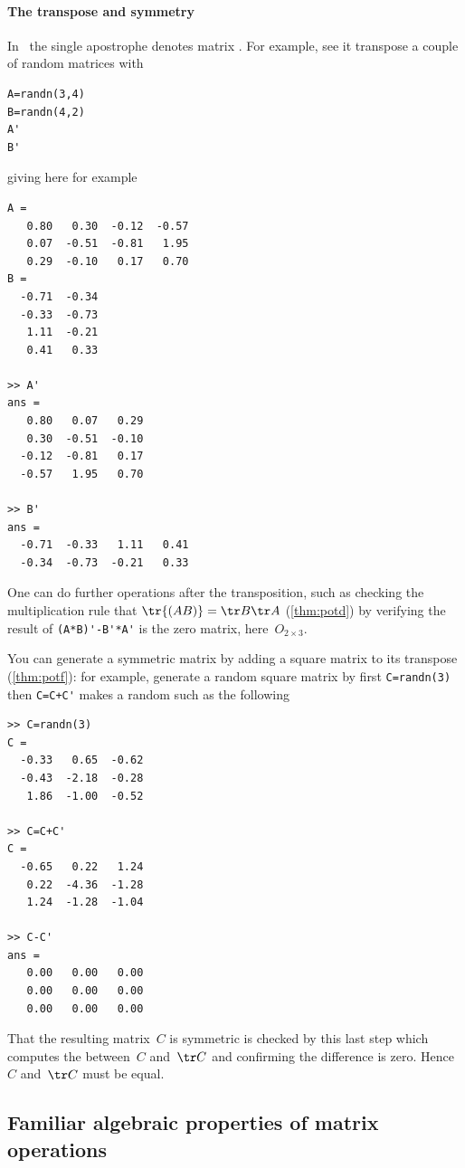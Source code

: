 \paragraph{The transpose and symmetry}
In \script\ the single apostrophe denotes matrix .
For example, see it transpose a couple of random matrices with
\begin{verbatim}
A=randn(3,4)
B=randn(4,2)
A'
B'
\end{verbatim}
\setbox\ajrqrbox\hbox{}%
\marginajrbox%
giving here for example \twodp
\begin{verbatim}
A =
   0.80   0.30  -0.12  -0.57
   0.07  -0.51  -0.81   1.95
   0.29  -0.10   0.17   0.70
B =
  -0.71  -0.34
  -0.33  -0.73
   1.11  -0.21
   0.41   0.33

>> A'
ans =
   0.80   0.07   0.29
   0.30  -0.51  -0.10
  -0.12  -0.81   0.17
  -0.57   1.95   0.70

>> B'
ans =
  -0.71  -0.33   1.11   0.41
  -0.34  -0.73  -0.21   0.33
\end{verbatim}
One can do further operations after the transposition, such as checking the multiplication rule that \(\tr{(AB)}=\tr B\tr A\) (\cref{thm:potd}) by verifying the result of \verb|(A*B)'-B'*A'| is the zero matrix, here~\(O_{2\times3}\).

You can generate a symmetric matrix by adding a square matrix to its transpose (\cref{thm:potf}): for example, generate a random square matrix by first \verb|C=randn(3)| then \verb|C=C+C'| makes a random  such as the following \twodp
\begin{verbatim}
>> C=randn(3)
C =
  -0.33   0.65  -0.62
  -0.43  -2.18  -0.28
   1.86  -1.00  -0.52

>> C=C+C'
C =
  -0.65   0.22   1.24
   0.22  -4.36  -1.28
   1.24  -1.28  -1.04

>> C-C'
ans =
   0.00   0.00   0.00
   0.00   0.00   0.00
   0.00   0.00   0.00
\end{verbatim}
That the resulting matrix~\(C\) is symmetric is checked by this last step which computes the  between~\(C\) and~\(\tr C\) and confirming the difference is zero. 
Hence \(C\) and~\(\tr C\) must be equal.






\subsection{Familiar algebraic properties of matrix operations}
\label{sec:fapmo}

